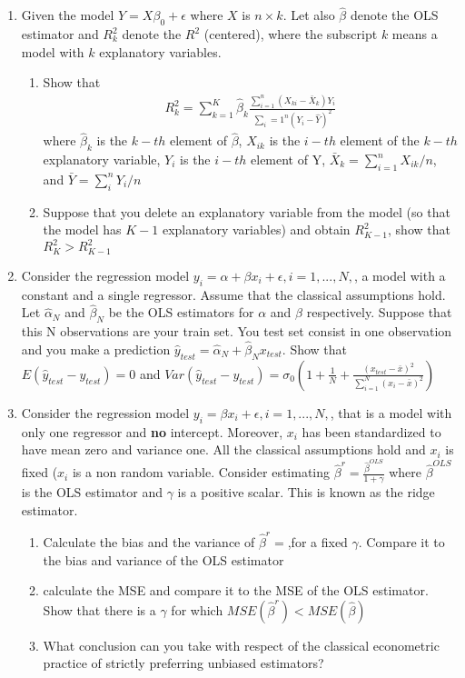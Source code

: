 \documentclass[12pt,onecolumn]{article}
\begin{document}
\begin{enumerate}
  \item Given the model $Y = X \beta_0 + \epsilon$ where $X$ is $n \times k$. Let also $\hat \beta$ denote the OLS estimator and $R^2_k$ denote the  $R^2$ (centered), where the subscript $k$ means a model with $k$ explanatory variables.
  \begin{enumerate}
    \item Show that 
    \begin{align}
      R^2_k = \sum_{k=1}^K \hat \beta_k \frac{\sum_{i=1}^n (X_{ki}-\bar{X}_k)Y_i}{\sum_i=1^n (Y_i-\hat Y)^2}
    \end{align}
    where $\hat \beta_k$ is the $k-th$ element of $\hat \beta$, $X_{ik}$ is the $i-th$ element of the $k-th$ explanatory variable, $Y_i$ is the $i-th$ element of Y, $\bar X_k = \sum_{i=1}^n X_{ik}/n$, and $\bar Y = \sum_i^n Y_i/n$
    \item Suppose that you delete an explanatory variable from the model (so that the model has $K-1$ explanatory variables) and obtain $R^2_{K-1}$, show that $R^2_{K}>R^2_{K-1}$
  \end{enumerate}
        
  \item Consider the regression model $y_i = \alpha +\beta x_i +\epsilon, i=1,...,N,$, a model with a constant and a single regressor. Assume that the classical assumptions hold. Let $\hat \alpha_N$ and $\hat \beta_N$ be the OLS estimators for $\alpha$ and $\beta$ respectively. Suppose that this N observations are your train set. You test set consist in one observation and you make a prediction $\hat y_{test}=\hat \alpha_N + \hat \beta_N x_{test}$. Show that $E(\hat y_{test}-y_{test})=0$ and $Var(\hat y_{test}-y_{test})=\sigma_0 \left( 1+\frac{1}{N}+\frac{(x_{test}-\bar x)^2}{\sum_{i=1}^N (x_i-\bar x)^2 }\right)$
  
  
  
  
  \item Consider the regression model $y_i =  \beta x_i +\epsilon, i=1,...,N,$, that is a model with only one regressor and {\bf no} intercept. Moreover, $x_i$ has been standardized to have mean zero and variance one. All the classical assumptions hold and $x_i$ is fixed ($x_i$ is a non random variable. Consider estimating $\hat \beta^r= \frac{\hat \beta^{OLS}}{1+\gamma}$ where $\hat \beta^{OLS}$ is the OLS estimator and $\gamma$ is a positive scalar. This is known as the ridge estimator.
  \begin{enumerate}
	  \item Calculate the bias and the variance of $\hat \beta^r=$,for a fixed $\gamma$. Compare it to the bias and variance of the OLS estimator
	  \item calculate the MSE and compare it to the MSE of the OLS estimator. Show that there is a $\gamma$ for which $MSE(\hat \beta^r)<MSE(\hat \beta)$
	  \item What conclusion can you take with respect of the classical econometric practice of strictly preferring unbiased estimators?
\end{enumerate}
  
  

\end{enumerate}
\end{document}
